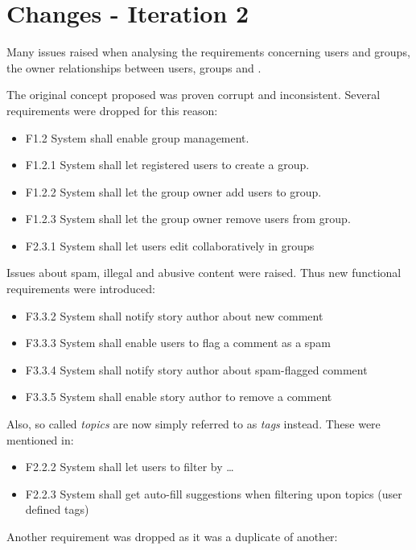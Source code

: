 \documentclass[11pt]{book}
\begin{document}
\section{Changes - Iteration 2}\label{changes---iteration-2}

Many issues raised when analysing the requirements concerning users and groups, the owner relationships between users, groups and \wallentityp.

The original concept proposed was proven corrupt and inconsistent. Several requirements were dropped for this reason:

\begin{itemize}
  \item F1.2 System shall enable group management.
  \item F1.2.1 System shall let registered users to create a group.
  \item F1.2.2 System shall let the group owner add users to group.
  \item F1.2.3 System shall let the group owner remove users from group.
  \item F2.3.1 System shall let users edit \wallentityp collaboratively in groups
\end{itemize}

Issues about spam, illegal and abusive content were raised. Thus new functional requirements were introduced:

\begin{itemize}
  \item F3.3.2 System shall notify story author about new comment
  \item F3.3.3 System shall enable users to flag a comment as a spam
  \item F3.3.4 System shall notify story author about spam-flagged comment
  \item F3.3.5 System shall enable story author to remove a comment
\end{itemize}

Also, so called \emph{topics} are now simply referred to as \emph{tags}
instead. These were mentioned in:

\begin{itemize}
  \item F2.2.2 System shall let users to filter \wallentityp by \ldots{}
  \item F2.2.3 System shall get auto-fill suggestions when filtering upon topics (user defined tags)
\end{itemize}

Another requirement was dropped as it was a duplicate of another:
\end{document}
